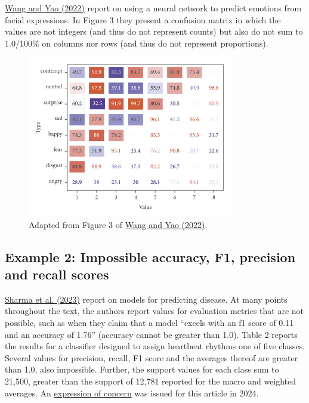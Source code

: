 \documentclass[letterpaper, 12pt]{article}
\begin{document}
\href{https://doi.org/10.1155/2022/6451199}{Wang and Yao (2022)} report on using a neural network to predict emotions from facial expressions. In Figure 3 they present a confusion matrix in which the values are not integers (and thus do not represent counts) but also do not sum to 1.0/100\% on columns nor rows (and thus do not represent proportions).

\begin{figure}[h!tbp]
    \centering
    \includegraphics[width=0.8\textwidth]{img/multiclass_classifiers/wang_and_yao_fig_3.jpg}
    \caption*{Adapted from Figure 3 of \href{https://doi.org/10.1155/2022/6451199}{Wang and Yao (2022)}.}
\end{figure}

\pagebreak

\subsection*{Example 2: Impossible accuracy, F1, precision and recall scores}

\href{https://doi.org/10.1109/IC3I59117.2023.10397896}{Sharma et al. (2023)} report on models for predicting disease. At many points throughout the text, the authors report values for evaluation metrics that are not possible, such as when they claim that a model ``excels with an f1
score of 0.11 and an accuracy of 1.76'' (accuracy cannot be greater than 1.0). Table 2 reports the results for a classifier designed to assign heartbeat rhythms one of five classes. Several values for precision, recall, F1 score and the averages thereof are greater than 1.0, also impossible. Further, the support values for each class sum to 21,500, greater than the support of 12,781 reported for the macro and weighted averages. An \href{https://doi.org/10.1109/IC3I59117.2023.10703725}{expression of concern} was issued for this article in 2024.
\end{document}
